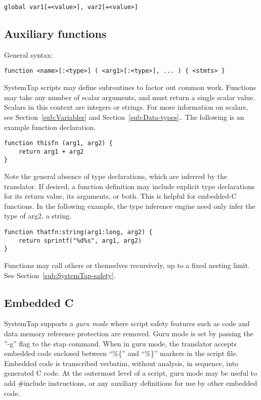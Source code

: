 \documentclass[twoside,english]{article}
\newenvironment{vindent}
{\begin{list}{}{\setlength{\listparindent}{6pt}}
\item[]}
{\end{list}}
\begin{document}
\begin{vindent}
\begin{verbatim}
global var1[=<value>], var2[=<value>]
\end{verbatim}
\end{vindent}

\subsection{Auxiliary functions\label{sub:Auxiliary-functions}}
General syntax:

\begin{vindent}
\begin{verbatim}
function <name>[:<type>] ( <arg1>[:<type>], ... ) { <stmts> }
\end{verbatim}
\end{vindent}
SystemTap scripts may define subroutines to factor out common work. Functions
may take any number of scalar arguments, and must return a single scalar
value. Scalars in this context are integers or strings. For more information
on scalars, see Section~\ref{sub:Variables} and Section~\ref{sub:Data-types}\texttt{.}
The following is an example function declaration.

\begin{vindent}
\begin{verbatim}
function thisfn (arg1, arg2) {
    return arg1 + arg2
}
\end{verbatim}
\end{vindent}
Note the general absence of type declarations, which are inferred by the
translator. If desired, a function definition may include explicit type declarations
for its return value, its arguments, or both. This is helpful for embedded-C
functions. In the following example, the type inference engine need only
infer the type of arg2, a string.

\begin{vindent}
\begin{verbatim}
function thatfn:string(arg1:long, arg2) {
    return sprintf("%d%s", arg1, arg2)
}
\end{verbatim}
\end{vindent}
Functions may call others or themselves recursively, up to a fixed nesting
limit. See Section~\ref{sub:SystemTap-safety}.


\subsection{Embedded C\label{sub:Embedded-C}}
SystemTap supports a \emph{guru mode} where script safety
features such as code and data memory reference protection are removed. Guru
mode is set by passing the ''-g'' flag to the stap command. When in guru
mode, the translator accepts embedded code enclosed between {}``\%\{''
and {}``\%\}'' markers in the script file. Embedded code is transcribed
verbatim, without analysis, in sequence, into generated C code. At the outermost
level of a script, guru mode may be useful to add \#include instructions,
or any auxiliary definitions for use by other embedded code.
\end{document}
